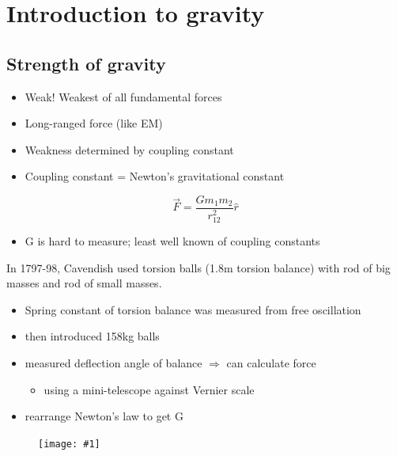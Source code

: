 \documentclass[a4paper]{article} %
\renewcommand{\picture}[1]
{
\begin{figure}[h]
\centering
\texttt{[image: \#1]}
\end{figure}
}
\begin{document}
\section{Introduction to gravity}
\subsection{Strength of gravity}
\begin{itemize}
\item Weak! Weakest of all fundamental forces
\item Long-ranged force (like EM)
\item Weakness determined by coupling constant
\item Coupling constant = Newton's gravitational constant
\end{itemize}
\begin{equation}
\vec{F}=\frac{Gm_1 m_2}{r_{12}^2}\hat{r}
\end{equation}
\begin{itemize}
\item G is hard to measure; least well known of coupling constants
\end{itemize}
In 1797-98, Cavendish used torsion balls (1.8m torsion balance) with rod of big masses and rod of small masses. 
\begin{itemize}
\item Spring constant of torsion balance was measured from free oscillation
\item then introduced 158kg balls
\item measured deflection angle of balance $\Rightarrow$ can calculate force
\begin{itemize}
\item using a mini-telescope against Vernier scale
\end{itemize}
\item rearrange Newton's law to get G
\end{itemize}

\picture{images/cavendish-torsion-balance.png}
 
\end{document}

